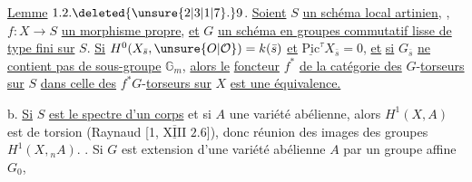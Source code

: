 
\uline{Lemme} $1.2.\deleted{\unsure{2|3|1|7}.}9$. \uline{Soient} $S$ \uline{un schéma local artinien}, , $f:X\longrightarrow S$
\uline{un morphisme propre}, \uline{et}
$G$ \uline{un schéma en groupes commutatif lisse de type fini sur} $S$.
\uline{Si} $H^0(X_{\bar s},\unsure{O|\mathcal O})=k(\bar s)$ \uline{et} $\underline{\mathrm{Pic}}^{\tau}X_{\bar s}=0$, \uline{et}
 \uline{si} $G_{\bar s}$ \uline{ne contient pas de sous-groupe} ${\mathbb G}_m$, \uline{alors le}  \uline{foncteur} $f^*$
\uline{de la catégorie des} $G$-\uline{torseurs sur} $S$ \uline{dans celle des} $f^*G$-\uline{torseurs sur} $X$
\uline{est une équivalence.}


b. \uline{Si} $S$ \uline{est le spectre d'un corps} et si $A$  une variété
abélienne, alors $H^1(X,A)$ est de torsion (Raynaud [1, $\underline{\overline{\mathrm{XIII}}}$ $2.6$]),
donc réunion des images des groupes $H^1(X,{}_nA)$. . Si $G$ est extension d'une variété
abélienne $A$ par un groupe  affine $G_0$, 

